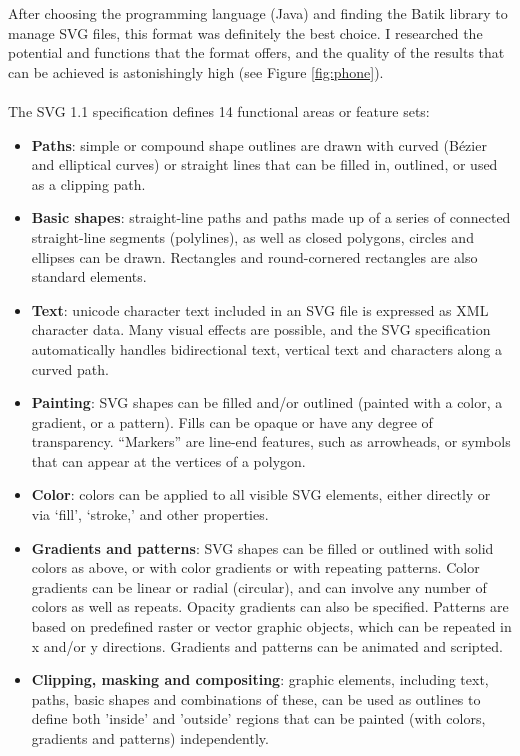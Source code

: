 \documentclass[]{usiinfbachelorproject}
\begin{document}
After choosing the programming language (Java) and finding the Batik library to manage SVG files, this format was definitely the best choice. I researched the potential and functions that the format offers, and the quality of the results that can be achieved is astonishingly high (see Figure \ref{fig:phone}).\\\\
The SVG 1.1 specification defines 14 functional areas or feature sets:
\begin{itemize}
	\item {\bf Paths}: simple or compound shape outlines are drawn with curved (B\'ezier and elliptical curves) or straight lines that can be filled in, outlined, or used as a clipping path.
	 \item {\bf Basic shapes}: straight-line paths and paths made up of a series of connected straight-line segments (polylines), as well as closed polygons, circles and ellipses can be drawn. Rectangles and round-cornered rectangles are also standard elements.
	\item {\bf Text}: unicode character text included in an SVG file is expressed as XML character data. Many visual effects are possible, and the SVG specification automatically handles bidirectional text, vertical text and characters along a curved path.
	\item {\bf Painting}: SVG shapes can be filled and/or outlined (painted with a color, a gradient, or a pattern). Fills can be opaque or have any degree of transparency. ``Markers'' are line-end features, such as arrowheads, or symbols that can appear at the vertices of a polygon.
	\item {\bf Color}: colors can be applied to all visible SVG elements, either directly or via `fill', `stroke,' and other properties.
	\item {\bf Gradients and patterns}: SVG shapes can be filled or outlined with solid colors as above, or with color gradients or with repeating patterns. Color gradients can be linear or radial (circular), and can involve any number of colors as well as repeats. Opacity gradients can also be specified. Patterns are based on predefined raster or vector graphic objects, which can be repeated in x and/or y directions. Gradients and patterns can be animated and scripted.
	\item {\bf Clipping, masking and compositing}: graphic elements, including text, paths, basic shapes and combinations of these, can be used as outlines to define both 'inside' and 'outside' regions that can be painted (with colors, gradients and patterns) independently.

\end{itemize}
\end{document}
